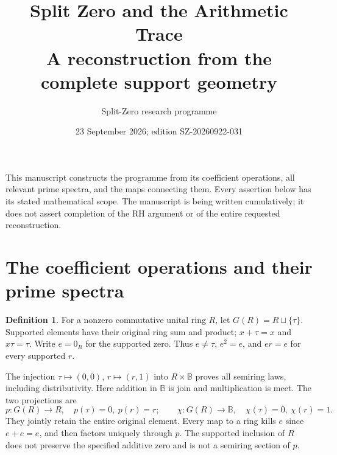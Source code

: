 \documentclass[11pt,a4paper]{article}
\title{Split Zero and the Arithmetic Trace\\A reconstruction from the complete support geometry}
\author{Split-Zero research programme}
\date{23 September 2026; edition SZ-20260922-031}
\theoremstyle{definition}\newtheorem{definition}[theorem]{Definition}
\newcommand{\B}{\mathbb B}\newcommand{\N}{\mathbb N}
\begin{document}
\maketitle
This manuscript constructs the programme from its coefficient operations, all relevant prime spectra, and the maps connecting them. Every assertion below has its stated mathematical scope. The manuscript is being written cumulatively; it does not assert completion of the RH argument or of the entire requested reconstruction.
\tableofcontents

\section{The coefficient operations and their prime spectra}
\label{sec:rebuilt-spectra}
\begin{definition}
For a nonzero commutative unital ring $R$, let $G(R)=R\sqcup\{\tau\}$. Supported elements have their original ring sum and product; $x+\tau=x$ and $x\tau=\tau$. Write $e=0_R$ for the supported zero. Thus $e\ne\tau$, $e^2=e$, and $er=e$ for every supported $r$.
\end{definition}
The injection $\tau\mapsto(0,0)$, $r\mapsto(r,1)$ into $R\times\B$ proves all semiring laws, including distributivity. Here addition in $\B$ is join and multiplication is meet. The two projections are
\begin{equation}\label{eq:base-two-maps}
 p:G(R)\to R,\quad p(\tau)=0,\ p(r)=r;
 \qquad \chi:G(R)\to\B,\quad\chi(\tau)=0,\ \chi(r)=1.
\end{equation}
They jointly retain the entire original element. Every map to a ring kills $e$ since $e+e=e$, and then factors uniquely through $p$. The supported inclusion of $R$ does not preserve the specified additive zero and is not a semiring section of $p$.
\end{document}
